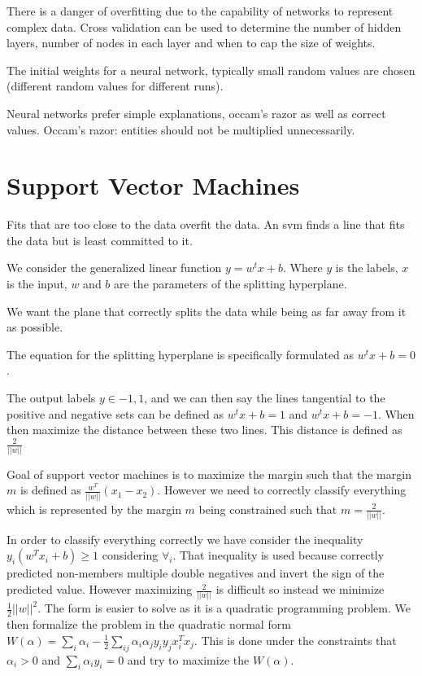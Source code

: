 \documentclass{article}
\begin{document}
There is a danger of overfitting due to the capability of networks to represent
complex data. Cross validation can be used to determine the number of hidden
layers, number of nodes in each layer and when to cap the size of weights. 

The initial weights for a neural network, typically small random values are
chosen (different random values for different runs). 

Neural networks prefer simple explanations, occam's razor as well as correct
values.  Occam's razor: entities should not be multiplied unnecessarily. 

\section{Support Vector Machines}

Fits that are too close to the data overfit the data. An svm finds a line
that fits the data but is least committed to it. 

We consider the generalized linear function $y = w^tx + b$. Where $y$ is the
labels, $x$ is the input, $w$ and $b$ are the parameters of the splitting
hyperplane. 

We want the plane that correctly splits the data while being as far away from it
as possible. 

The equation for the splitting hyperplane is specifically formulated as
$w^tx + b = 0$.

The output labels $y \in {-1, 1}$, and we can then say the lines tangential to 
the positive and negative sets can be defined as $w^tx + b = 1$ and 
$w^tx + b = -1$. When then maximize the distance between these two lines. This 
distance is defined as $\frac{2}{\vert\vert w\vert\vert}$

Goal of support vector machines is to maximize the margin such that the margin
$m$ is defined as $\frac{w^T}{\vert\vert w\vert\vert}(x_1 - x_2)$. However we 
need to correctly classify everything which is represented by the margin $m$
being constrained such that $m = \frac{2}{\vert\vert w\vert\vert}$.

In order to classify everything correctly we have consider the inequality
$y_i(w^Tx_i + b) \geq 1$ considering $ \forall_i$. That inequality is used
because correctly predicted non-members multiple double negatives and invert the 
sign of the predicted value. However maximizing $\frac{2}{\vert\vert w\vert\vert
}$ is difficult so instead we minimize $\frac{1}{2}\vert\vert w\vert\vert^2$.
The form is easier to solve as it is a quadratic programming problem. We then 
formalize the problem in the quadratic normal form $W(\alpha) = \sum_i \alpha_i
 - \frac{1}{2}\sum_{ij}\alpha_i \alpha_j y_i y_j x_i^T x_j$. This is done under
 the constraints that $\alpha_i > 0$ and $\sum_i \alpha_i y_i = 0$ and try to
 maximize the $W(\alpha)$.
\end{document}
